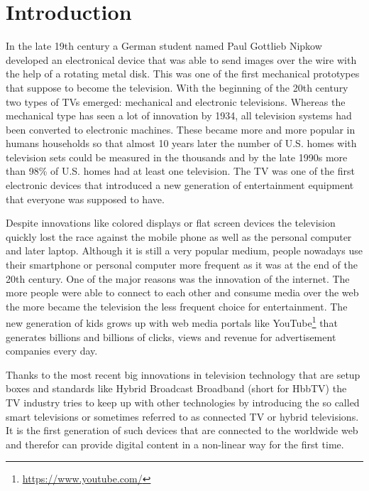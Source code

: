 %

\chapter{Introduction\label{cha:introduction}}

In the late 19th century a German student named Paul Gottlieb Nipkow developed an electronical device
that was able to send images over the wire with the help of a rotating metal disk. This was one of the first
mechanical prototypes that suppose to become the television. With the beginning of the 20th century two types
of TVs emerged: mechanical and electronic televisions. Whereas the mechanical type has seen a lot of
innovation by 1934, all television systems had been converted to electronic machines. These became more and
more popular in humans households so that almost 10 years later the number of U.S. homes with television sets
could be measured in the thousands and by the late 1990s more than 98\% of U.S. homes had at least one
television. The TV was one of the first electronic devices that introduced a new generation of entertainment
equipment that everyone was supposed to have.

Despite innovations like colored displays or flat screen devices the television quickly lost the race against
the mobile phone as well as the personal computer and later laptop. Although it is still a very popular
medium, people nowadays use their smartphone or personal computer more frequent as it was at the end of the
20th century. One of the major reasons was the innovation of the internet. The more people were able to connect
to each other and consume media over the web the more became the television the less frequent choice for
entertainment. The new generation of kids grows up with web media portals like YouTube\footnote{\url{https://www.youtube.com/}}
that generates billions and billions of clicks, views and revenue for advertisement companies every day.

Thanks to the most recent big innovations in television technology that are setup boxes and standards like
Hybrid Broadcast Broadband (short for HbbTV) the TV industry tries to keep up with other technologies by
introducing the so called smart televisions or sometimes referred to as connected TV or hybrid televisions.
It is the first generation of such devices that are connected to the worldwide web and therefor can provide
digital content in a non-linear way for the first time.

